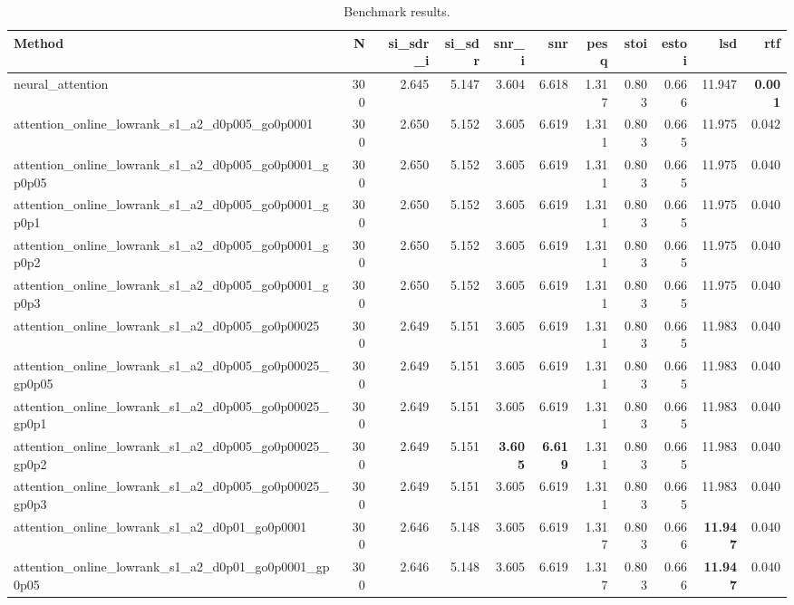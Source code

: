 \begin{table}[t]
\centering
\caption{Benchmark results.}
\label{tab:bench}
\begin{tabular}{lrrrrrrrrrr}
\toprule
Method & N & si\_sdr\_i & si\_sdr & snr\_i & snr & pesq & stoi & estoi & lsd & rtf \\
\midrule
neural_attention & 300 & 2.645 & 5.147 & 3.604 & 6.618 & 1.317 & 0.803 & 0.666 & 11.947 & \textbf{0.001} \\
attention_online_lowrank_s1_a2_d0p005_go0p0001 & 300 & 2.650 & 5.152 & 3.605 & 6.619 & 1.311 & 0.803 & 0.665 & 11.975 & 0.042 \\
attention_online_lowrank_s1_a2_d0p005_go0p0001_gp0p05 & 300 & 2.650 & 5.152 & 3.605 & 6.619 & 1.311 & 0.803 & 0.665 & 11.975 & 0.040 \\
attention_online_lowrank_s1_a2_d0p005_go0p0001_gp0p1 & 300 & 2.650 & 5.152 & 3.605 & 6.619 & 1.311 & 0.803 & 0.665 & 11.975 & 0.040 \\
attention_online_lowrank_s1_a2_d0p005_go0p0001_gp0p2 & 300 & 2.650 & 5.152 & 3.605 & 6.619 & 1.311 & 0.803 & 0.665 & 11.975 & 0.040 \\
attention_online_lowrank_s1_a2_d0p005_go0p0001_gp0p3 & 300 & 2.650 & 5.152 & 3.605 & 6.619 & 1.311 & 0.803 & 0.665 & 11.975 & 0.040 \\
attention_online_lowrank_s1_a2_d0p005_go0p00025 & 300 & 2.649 & 5.151 & 3.605 & 6.619 & 1.311 & 0.803 & 0.665 & 11.983 & 0.040 \\
attention_online_lowrank_s1_a2_d0p005_go0p00025_gp0p05 & 300 & 2.649 & 5.151 & 3.605 & 6.619 & 1.311 & 0.803 & 0.665 & 11.983 & 0.040 \\
attention_online_lowrank_s1_a2_d0p005_go0p00025_gp0p1 & 300 & 2.649 & 5.151 & 3.605 & 6.619 & 1.311 & 0.803 & 0.665 & 11.983 & 0.040 \\
attention_online_lowrank_s1_a2_d0p005_go0p00025_gp0p2 & 300 & 2.649 & 5.151 & \textbf{3.605} & \textbf{6.619} & 1.311 & 0.803 & 0.665 & 11.983 & 0.040 \\
attention_online_lowrank_s1_a2_d0p005_go0p00025_gp0p3 & 300 & 2.649 & 5.151 & 3.605 & 6.619 & 1.311 & 0.803 & 0.665 & 11.983 & 0.040 \\
attention_online_lowrank_s1_a2_d0p01_go0p0001 & 300 & 2.646 & 5.148 & 3.605 & 6.619 & 1.317 & 0.803 & 0.666 & \textbf{11.947} & 0.040 \\
attention_online_lowrank_s1_a2_d0p01_go0p0001_gp0p05 & 300 & 2.646 & 5.148 & 3.605 & 6.619 & 1.317 & 0.803 & 0.666 & \textbf{11.947} & 0.040 \\

\end{tabular}
\end{table}
